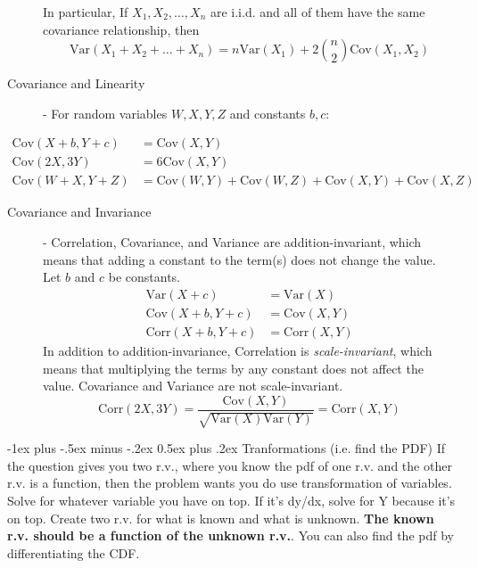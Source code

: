 \documentclass[10pt,landscape]{article}
\makeatletter
\theoremstyle{definition}
\newcommand{\var}{\textrm{Var}}
\newcommand{\cov}{\textrm{Cov}}
\newcommand{\corr}{\textrm{Corr}}
\renewcommand{\section}{\@startsection{section}{1}{0mm}%
                                {-1ex plus -.5ex minus -.2ex}%
                                {0.5ex plus .2ex}%
                                {\normalfont\large\bfseries}}
\makeatother
\begin{document}
\begin{multicols}{3}
\begin{description}
    In particular, If $X_1, X_2, \dots, X_n$ are i.i.d. and all of them have the same covariance relationship, then 
    \[\var(X_1 + X_2 + \dots + X_n ) = n\var(X_1) + 2{n \choose 2}\cov(X_1, X_2)\]
    
\item [Covariance and Linearity] - For random variables $W, X, Y, Z$ and constants $b, c$:
\end{description}
    \begin{align*}
        \cov(X + b, Y + c) &= \cov(X, Y) \\
        \cov(2X, 3Y) &= 6\cov(X, Y) \\
        \cov(W + X, Y + Z) &= \cov(W, Y) + \cov(W, Z) + \cov(X, Y) + \cov(X, Z)
    \end{align*}
\begin{description}
\item [Covariance and Invariance] - Correlation, Covariance, and Variance are addition-invariant, which means that adding a constant to the term(s) does not change the value. Let $b$ and $c$ be constants.
    \begin{align*}
        \var(X + c) &= \var(X) \\
        \cov(X + b, Y + c) &= \cov(X, Y) \\
        \corr(X + b, Y + c) &= \corr(X, Y) 
    \end{align*}
    In addition to addition-invariance, Correlation is \emph{scale-invariant}, which means that multiplying the terms by any constant does not affect the value. Covariance and Variance are not scale-invariant.
    \[\corr(2X, 3Y) = \frac{\cov(X, Y)}{\sqrt{\var(X)\var(Y)}} = \corr(X, Y)\]

\end{description}


\section{Tranformations (i.e. find the PDF)}
If the question gives you two r.v., where you know the pdf of one r.v. and the other r.v. is a function, then the problem wants you do use transformation of variables. Solve for whatever variable you have on top. If it's dy/dx, solve for Y because it's on top. Create two r.v. for what is known and what is unknown. \textbf{The known r.v. should be a function of the unknown r.v.}. You can also find the pdf by differentiating the CDF.
\begin{description}


\end{description}
\end{multicols}
\end{document}
